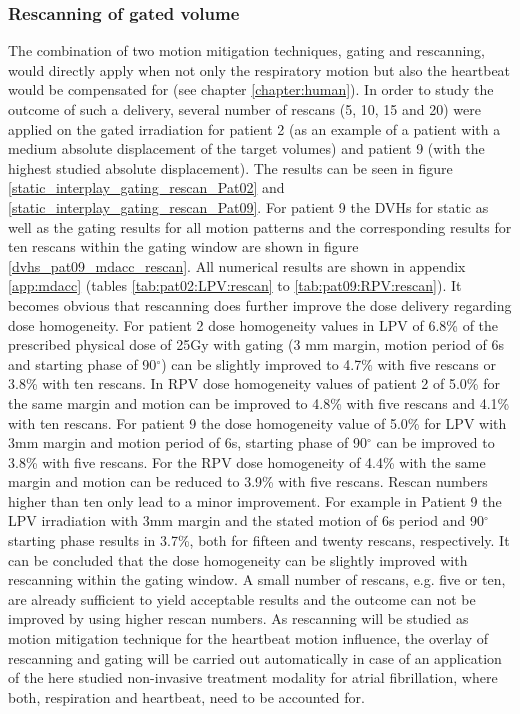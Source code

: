 \documentclass[type=dr, dr=rernat, accentcolor=tud7b,colorbacktitle, bigchapter, openright, twoside, 12pt ]{tudthesis}
\begin{document}
\newpage


\subsubsection*{Rescanning of gated volume}
\label{RescanofGate}

The combination of two motion mitigation techniques, gating and rescanning, would directly apply when not only the respiratory motion but 
also the heartbeat would be compensated for (see chapter \ref{chapter:human}). In order to study the outcome of such a delivery, several 
number of rescans (5, 10, 15 and 20) were applied on the gated irradiation for patient 2 (as an example of a patient with a medium absolute 
displacement of the target volumes) and patient 9 (with the highest studied absolute displacement). The results can be seen in figure 
\ref{static_interplay_gating_rescan_Pat02} and \ref{static_interplay_gating_rescan_Pat09}. For patient 9 the DVHs for static as well as 
the gating results for all motion patterns and the corresponding results for ten rescans within the gating window are shown in 
figure \ref{dvhs_pat09_mdacc_rescan}. All numerical results are shown in appendix \ref{app:mdacc} (tables \ref{tab:pat02:LPV:rescan} to 
\ref{tab:pat09:RPV:rescan}).\newline
\newline
It becomes obvious that rescanning does further improve the dose delivery regarding dose homogeneity. For patient 2 
dose homogeneity values in LPV of 6.8\% of the prescribed physical dose of 25Gy with gating (3 mm margin, motion period of 6s and starting 
phase of 90$^{\circ}$) can be slightly improved to 4.7\% with five rescans or 3.8\% with ten rescans. In RPV dose homogeneity values of 
patient 2 of 5.0\% for the same margin and motion can be improved to 4.8\% with five rescans and 4.1\% with ten rescans. 
For patient 9 the dose homogeneity value of 5.0\% for LPV with 3mm margin and motion period of 6s, starting phase of 90$^{\circ}$ can 
be improved to 3.8\% with five rescans. For the RPV dose homogeneity of 4.4\% with the same margin and motion can be reduced to 
3.9\% with five rescans. Rescan numbers higher than ten only lead to a minor improvement. For example in Patient 9 the LPV irradiation with 
3mm margin and the stated motion of 6s period and 90$^{\circ}$ starting phase results in 3.7\%, both for fifteen and twenty rescans, 
respectively.\newline
\newline
It can be concluded that the dose homogeneity can be slightly improved with rescanning within the gating window. A small number of rescans, 
e.g. five or ten, are already sufficient to yield acceptable results and the outcome can not be improved by using higher rescan numbers. 
As rescanning will be studied as motion mitigation technique for the heartbeat motion influence, the overlay of rescanning and gating will be 
carried out automatically in case of an application of the here studied non-invasive treatment modality for atrial fibrillation, where both, 
respiration and heartbeat, need to be accounted for. 
\end{document}
